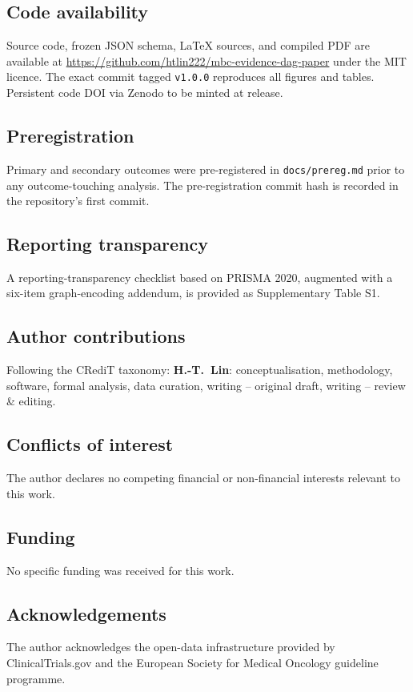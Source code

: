 \documentclass[11pt,a4paper]{article}
\begin{document}
\subsection*{Code availability}
Source code, frozen JSON schema, LaTeX sources, and compiled PDF are available at \url{https://github.com/htlin222/mbc-evidence-dag-paper} under the MIT licence. The exact commit tagged \texttt{v1.0.0} reproduces all figures and tables. Persistent code DOI via Zenodo to be minted at release.

\subsection*{Preregistration}
Primary and secondary outcomes were pre-registered in \texttt{docs/prereg.md} prior to any outcome-touching analysis. The pre-registration commit hash is recorded in the repository's first commit.

\subsection*{Reporting transparency}
A reporting-transparency checklist based on PRISMA 2020, augmented with a six-item graph-encoding addendum, is provided as Supplementary Table S1.

\subsection*{Author contributions}
Following the CRediT taxonomy: \textbf{H.-T.\ Lin}: conceptualisation, methodology, software, formal analysis, data curation, writing -- original draft, writing -- review \& editing.

\subsection*{Conflicts of interest}
The author declares no competing financial or non-financial interests relevant to this work.

\subsection*{Funding}
No specific funding was received for this work.

\subsection*{Acknowledgements}
The author acknowledges the open-data infrastructure provided by ClinicalTrials.gov and the European Society for Medical Oncology guideline programme.



\end{document}
